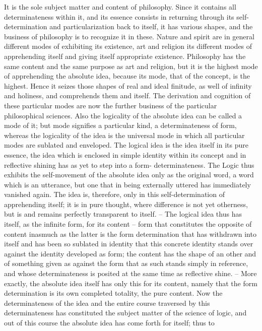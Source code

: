 It is the sole subject matter and content of philosophy. Since it contains
all determinateness within it, and its essence consists in returning through
its self-determination and particularization back to itself, it has various
shapes, and the business of philosophy is to recognize it in these. Nature
and spirit are in general different modes of exhibiting its existence, art
and religion its different modes of apprehending itself and giving itself
appropriate existence. Philosophy has the same content and the same
purpose as art and religion, but it is the highest mode of apprehending the
absolute idea, because its mode, that of the concept, is the highest. Hence
it seizes those shapes of real and ideal finitude, as well of infinity and
holiness, and comprehends them and itself. The derivation and cognition
of these particular modes are now the further business of the particular
philosophical sciences. Also the logicality of the absolute idea can be called
a mode of it; but mode signifies a particular kind, a determinateness of
form, whereas the logicality of the idea is the universal mode in which
all particular modes are sublated and enveloped. The logical idea is the
idea itself in its pure essence, the idea which is enclosed in simple identity
within its concept and in reflective shining has as yet to step into a form-
determinateness. The Logic thus exhibits the self-movement of the absolute
idea only as the original word, a word which is an utterance, but one that
in being externally uttered has immediately vanished again. The idea is,
therefore, only in this self-determination of apprehending itself; it is in pure
thought, where difference is not yet otherness, but is and remains perfectly
transparent to itself. – The logical idea thus has itself, as the infinite form,
for its content – form that constitutes the opposite of content inasmuch as
the latter is the form determination that has withdrawn into itself and has
been so sublated in identity that this concrete identity stands over against
the identity developed as form; the content has the shape of an other and of
something given as against the form that as such stands simply in reference,
and whose determinateness is posited at the same time as reflective shine. –
More exactly, the absolute idea itself has only this for its content, namely
that the form determination is its own completed totality, the pure content.
Now the determinateness of the idea and the entire course traversed by this
determinateness has constituted the subject matter of the science of logic,
and out of this course the absolute idea has come forth for itself; thus to
